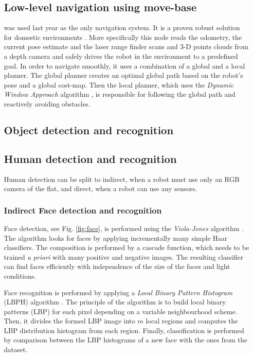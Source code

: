 \subsection{Low-level navigation using move-base} was used last year as the only navigation system. It is a proven robust solution for domestic environments \cite{Marder-Eppstein2010}. More specifically this node reads the odometry, the current pose estimate and the laser range finder scans and 3-D points clouds from a depth camera and safely drives the robot in the environment to a predefined goal. In order to navigate smoothly, it uses a combination of a global and a local planner. The global planner creates an optimal global path based on the robot's pose and a global cost-map. Then the local planner, which uses the \textit{Dynamic Window Approach} algorithm \cite{dwa}, is responsible for following the global path and reactively avoiding obstacles. 


\subsection{Object detection and recognition}

\subsection{Human detection and recognition}

Human detection can be split to indirect, when a robot must use only an RGB camera of the flat, and direct, when a robot can use any sensors. 

\subsubsection{\label{sec:vision}Indirect Face detection and recognition}

Face detection, see Fig. \ref{fig:face}, is performed using the \textit{Viola-Jones} algorithm \cite{Viola01_RapidObjDet}. The algorithm looks for faces by applying incrementally many simple Haar classifiers. The composition is performed by a cascade function, which needs to be trained \textit{a priori} with many positive and negative images. The resulting classifier can find faces efficiently with independence of the size of the faces and light conditions.

Face recognition is performed by applying a \textit{Local Binary Pattern Histogram} (LBPH) algorithm \cite{Ahonen04_FaceRecLBP}. The principle of the algorithm is to build local binary patterns (LBP) for each pixel depending on a variable neighbourhood scheme. Then, it divides the formed LBP image into $m$ local regions and computes the LBP distribution histogram from each region. Finally, classification is performed by comparison between the LBP histograms of a new face with the ones from the dataset.

